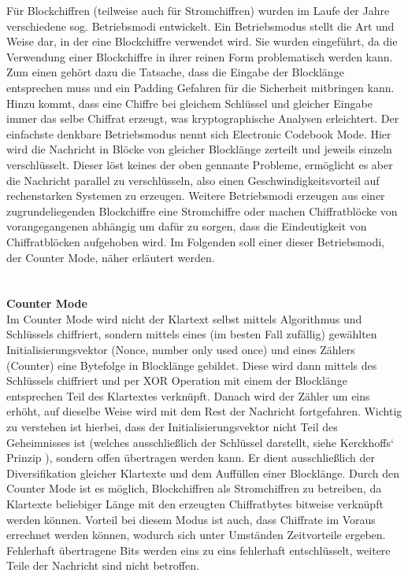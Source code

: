 \documentclass[13pt,a4paper,bibliography=totocnumbered,listof=totocnumbered]{scrartcl}
\begin{document}
Für Blockchiffren (teilweise auch für Stromchiffren) wurden im Laufe der Jahre verschiedene sog. Betriebsmodi entwickelt. Ein Betriebsmodus stellt die Art und Weise dar, in der eine Blockchiffre verwendet wird. Sie wurden eingeführt, da die Verwendung einer Blockchiffre in ihrer reinen Form problematisch werden kann. Zum einen gehört dazu die Tatsache, dass die Eingabe der Blocklänge entsprechen muss und ein Padding Gefahren für die Sicherheit mitbringen kann. Hinzu kommt, dass eine Chiffre bei gleichem Schlüssel und gleicher Eingabe immer das selbe Chiffrat erzeugt, was kryptographische Analysen erleichtert. Der einfachste denkbare Betriebsmodus nennt sich Electronic Codebook Mode. Hier wird die Nachricht in Blöcke von gleicher Blocklänge zerteilt und jeweils einzeln verschlüsselt. Dieser löst keines der oben gennante Probleme, ermöglicht es aber die Nachricht parallel zu verschlüsseln, also einen Geschwindigkeitsvorteil auf rechenstarken Systemen zu erzeugen. Weitere Betriebsmodi erzeugen aus einer zugrundeliegenden Blockchiffre eine Stromchiffre oder machen Chiffratblöcke von vorangegangenen abhängig um dafür zu sorgen, dass die Eindeutigkeit von Chiffratblöcken aufgehoben wird. Im Folgenden soll einer dieser Betriebsmodi, der Counter Mode, näher erläutert werden.\\
\cite[S. 223ff.]{42} \cite[S. 23f]{13} \cite[S. 88-94]{48}\\
\\\textbf{Counter Mode}\\
Im Counter Mode wird nicht der Klartext selbst mittels Algorithmus und Schlüssels chiffriert, sondern mittels eines (im besten Fall zufällig) gewählten Initialisierungsvektor (Nonce, number only used once) und eines Zählers (Counter) eine Bytefolge in Blocklänge gebildet. Diese wird dann mittels des Schlüssels chiffriert und per XOR Operation mit einem der Blocklänge entsprechen Teil des Klartextes verknüpft. Danach wird der Zähler um eins erhöht, auf dieselbe Weise wird mit dem Rest der Nachricht fortgefahren. Wichtig zu verstehen ist hierbei, dass der Initialisierungsvektor nicht Teil des Geheimnisses ist (welches ausschließlich der Schlüssel darstellt, siehe Kerckhoffs‘ Prinzip \cite[S. 38]{48}), sondern offen übertragen werden kann. Er dient ausschließlich der Diversifikation gleicher Klartexte und dem Auffüllen einer Blocklänge. Durch den Counter Mode ist es möglich, Blockchiffren als Stromchiffren zu betreiben, da Klartexte beliebiger Länge mit den erzeugten Chiffratbytes bitweise verknüpft werden können. Vorteil bei diesem Modus ist auch, dass Chiffrate im Voraus errechnet werden können, wodurch sich unter Umständen Zeitvorteile ergeben. Fehlerhaft übertragene Bits werden eins zu eins fehlerhaft entschlüsselt, weitere Teile der Nachricht sind nicht betroffen.\\
\end{document}
